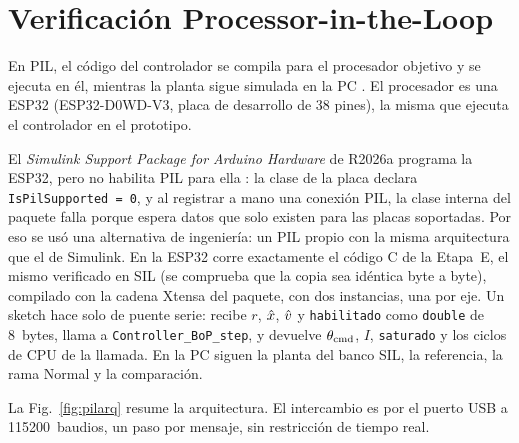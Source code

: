 \section{Verificación Processor-in-the-Loop}

En PIL, el código del controlador se compila para el procesador objetivo y se ejecuta en él,
mientras la planta sigue simulada en la PC \cite{mw_pil}. El procesador es una ESP32 (ESP32-D0WD-V3,
placa de desarrollo de 38 pines), la misma que ejecuta el controlador en el prototipo.

El \emph{Simulink Support Package for Arduino Hardware} de R2026a programa la ESP32, pero no
habilita PIL para ella \cite{mw_arduino}: la clase de la placa declara
\texttt{IsPilSupported = 0}, y al registrar a mano una conexión PIL, la clase interna del paquete
falla porque espera datos que solo existen para las placas soportadas. Por eso se usó una
alternativa de ingeniería: un PIL propio con la misma arquitectura que el de Simulink. En la ESP32 corre exactamente el código C de la Etapa~E, el mismo
verificado en SIL (se comprueba que la copia sea idéntica byte a byte), compilado con la
cadena Xtensa del paquete, con dos instancias, una por eje. Un sketch hace solo de puente serie:
recibe $r$, $\hat{x}$, $\hat{v}$ y \texttt{habilitado} como \texttt{double} de \SI{8}{bytes}, llama a
\texttt{Controller\_BoP\_step}, y devuelve $\theta_{\mathrm{cmd}}$, $I$, \texttt{saturado} y los ciclos de CPU de
la llamada. En la PC siguen la planta del banco SIL, la referencia, la rama Normal y la
comparación.

La Fig.~\ref{fig:pilarq} resume la arquitectura. El intercambio es por el puerto USB a
\SI{115200}{baudios}, un paso por mensaje, sin restricción de tiempo real.

